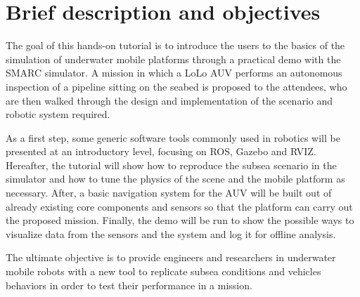 \documentclass[
10pt, %
a4paper, %
oneside, %
BCOR5mm, %
]{scrartcl}
\begin{document}
\let\thefootnote\relax{}




 

\section{Brief description and objectives}
\label{sec:description}
The goal of this hands-on tutorial is to introduce the users to the basics of the simulation of underwater mobile platforms through a practical demo with the SMARC simulator.
A mission in which a LoLo AUV performs an autonomous inspection of a pipeline sitting on the seabed is proposed to the attendees, who are then walked through the design and implementation of the scenario and robotic system required.

As a first step, some generic software tools commonly used in robotics will be presented at an introductory level, focusing on ROS, Gazebo and RVIZ.
Hereafter, the tutorial will show how to reproduce the subsea scenario in the simulator and how to tune the physics of the scene and the mobile platform as necessary.
After, a basic navigation system for the AUV will be built out of already existing core components and sensors so that the platform can carry out the proposed mission.
Finally, the demo will be run to show the possible ways to visualize data from the sensors and the system and log it for offline analysis.

The ultimate objective is to provide engineers and researchers in underwater mobile robots with a new tool to replicate subsea conditions and vehicles behaviors in order to test their performance in a mission. 
\\
\end{document}
